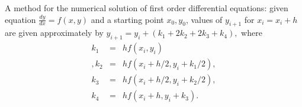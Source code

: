 A method for the numerical solution of first order differential
  equations: given equation $ \frac{dy}{dx} = f(x,y) $ and a starting
  point $x_{0}, y_{0}$, values of $y_{i+1}$ for $x_{i}=x_{i}+h$ are
  given approximately by 
  $y_{i+1}=y_{i}+(k_{1}+2k_{2}+2k_{3}+k_{4}),$
  where
  \begin{eqnarray*}
  k_{1}&=&hf(x_{i}, y_{i})\\, 
  k_{2}&=&hf(x_{i}+h/2, y_{i}+k_{1}/2),\\
  k_{3}&=&hf(x_{i}+h/2, y_{i}+k_{2}/2),\\ 
  k_{4}&=&hf(x_{i}+h, y_{i}+k_{3}).
  \end{eqnarray*}